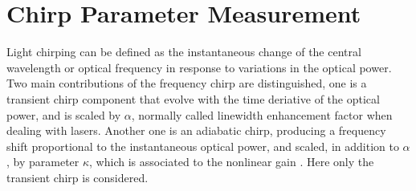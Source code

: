 


\section{Chirp Parameter Measurement}\label{sec:chirp_measurement}


Light chirping can be defined as the instantaneous change of the central wavelength or optical frequency in response to
variations in the optical power. Two main contributions of the frequency chirp are distinguished, one is a transient chirp component that evolve with the time deriative of the optical power, and is scaled by $\alpha$, normally called linewidth enhancement factor when dealing with lasers. Another one is an adiabatic chirp, producing a frequency shift proportional to the instantaneous optical power, and scaled, in addition to $\alpha$, by parameter $\kappa$, which is associated to the nonlinear gain \cite{villafranca2007precise, harder1983measurement}. Here only the transient chirp is considered. 

